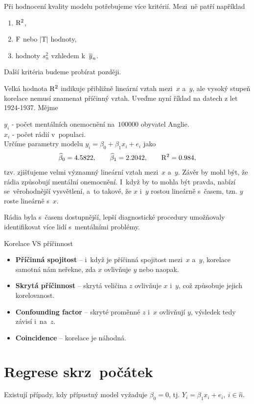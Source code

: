 Při hodnocení kvality modelu potřebujeme více kritérií. Mezi~ně patří například\begin{enumerate}
	\item {} $\mathrm{R}^2$,
	\item {} $\mathrm{F}$ nebo $|\mathrm{T}|$ hodnoty,
	\item {} hodnoty $s_n^2$ vzhledem k~$\overline{y}_n$.
\end{enumerate}
Další kritéria budeme probírat později.
\begin{example}
	Velká hodnota $\mathrm{R}^2$ indikuje přibližně lineární vztah mezi~$x$ a~$y$, ale vysoký stupeň korelace nemusí znamenat příčinný vztah.
	Uveďme nyní říklad na datech z let 1924-1937. Mějme
	
	 $y_i$ - počet mentálních onemocnění na~$100000$ obyvatel Anglie.\\
	 $x_i$ - počet rádií v~populaci.\\
	Určíme parametry modelu $y_i = \beta_0+\beta_1 x_i+e_i$ jako
	 $$ \widehat{\beta}_0 = 4.5822,\qquad\widehat{\beta}_1 = 2.2042,\qquad\mathrm{R}^2 = 0.984, $$
	tzv. zjišťujeme velmi významný lineární vztah mezi~$x$ a~$y$. Závěr by mohl být, že rádia způsobují mentální onemocnění. I~když by to mohla být pravda, nabízí se~věrohodnější vysvětlení, a~to takové, že $x$ i~$y$ rostou lineárně s~časem, tzn. $y$ roste lineárně s~$x$.
	
	Rádia byla s~časem dostupnější, lepší diagnostické procedury umožňovaly identifikovat více lidí s~mentálními problémy.
\end{example}
\begin{remark}
Korelace VS příčinnost

 \begin{itemize}
  \item \textbf{Příčinná spojitost} -- i~když je příčinná spojitost mezi~$x$ a~$y$, korelace samotná nám neřekne, zda $x$ ovlivňuje $y$ nebo naopak.
  \item \textbf{Skrytá příčinnost} -- skrytá veličina $z$ ovlivňuje $x$ i~$y$, což způsobuje jejich korelovanost.
  \item \textbf{Confounding factor} -- skryté proměnné $z$ i~$x$ ovlivňují $y$, výsledek tedy závisí i~na~$z$.
  \item \textbf{Coincidence} -- korelace je náhodná.
\end{itemize}
\end{remark}

\section{Regrese skrz~počátek}
Existují případy, kdy přípustný model vyžaduje $\beta_0 = 0$, tj. $
 Y_i = \beta_1 x_i + e_i,~ i\in\widehat{n}$.


